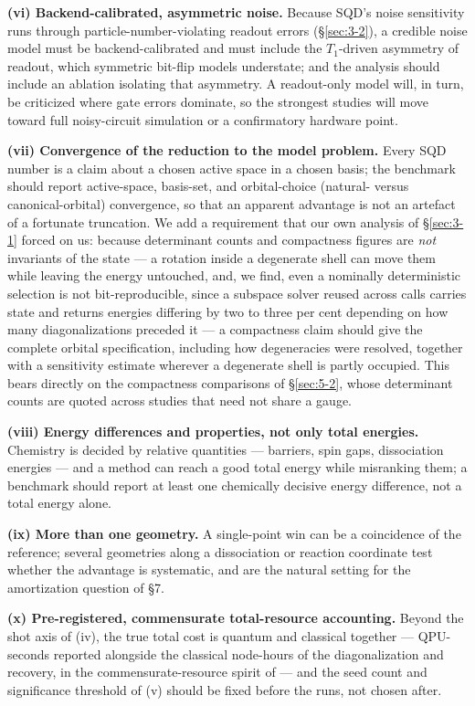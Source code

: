 \documentclass[onecolumn,a4paper]{quantumarticle}
\begin{document}
\textbf{(vi) Backend-calibrated, asymmetric noise.} Because SQD's noise sensitivity runs through particle-number-violating readout errors (\S\ref{sec:3-2}), a credible noise model must be backend-calibrated and must include the $T_1$-driven asymmetry of readout, which symmetric bit-flip models understate; and the analysis should include an ablation isolating that asymmetry. A readout-only model will, in turn, be criticized where gate errors dominate, so the strongest studies will move toward full noisy-circuit simulation or a confirmatory hardware point.

\textbf{(vii) Convergence of the reduction to the model problem.} Every SQD number is a claim about a chosen active space in a chosen basis; the benchmark should report active-space, basis-set, and orbital-choice (natural- versus canonical-orbital) convergence, so that an apparent advantage is not an artefact of a fortunate truncation. We add a requirement that our own analysis of \S\ref{sec:3-1} forced on us: because determinant counts and compactness figures are \emph{not} invariants of the state --- a rotation inside a degenerate shell can move them while leaving the energy untouched, and, we find, even a nominally deterministic selection is not bit-reproducible, since a subspace solver reused across calls carries state and returns energies differing by two to three per cent depending on how many diagonalizations preceded it --- a compactness claim should give the complete orbital specification, including how degeneracies were resolved, together with a sensitivity estimate wherever a degenerate shell is partly occupied. This bears directly on the compactness comparisons of \S\ref{sec:5-2}, whose determinant counts are quoted across studies that need not share a gauge.

\textbf{(viii) Energy differences and properties, not only total energies.} Chemistry is decided by relative quantities --- barriers, spin gaps, dissociation energies --- and a method can reach a good total energy while misranking them; a benchmark should report at least one chemically decisive energy difference, not a total energy alone.

\textbf{(ix) More than one geometry.} A single-point win can be a coincidence of the reference; several geometries along a dissociation or reaction coordinate test whether the advantage is systematic, and are the natural setting for the amortization question of \S7.

\textbf{(x) Pre-registered, commensurate total-resource accounting.} Beyond the shot axis of (iv), the true total cost is quantum and classical together --- QPU-seconds reported alongside the classical node-hours of the diagonalization and recovery, in the commensurate-resource spirit of \cite{raisuddin2025} --- and the seed count and significance threshold of (v) should be fixed before the runs, not chosen after.
\end{document}
